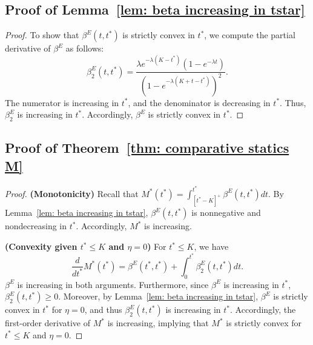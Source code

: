 \documentclass[12pt, letterpaper]{article}
\begin{document}
\subsection{Proof of Lemma~\ref{lem: beta increasing in tstar}}\label{subsec: beta increasing in tstar}

\begin{proof}%

To show that $\beta^E(t, t^*)$ is strictly convex in $t^*$, we compute the partial derivative of $\beta^E$ as follows:
\begin{equation}
    \beta^E_2(t, t^*) = \frac{\lambda e^{-\lambda (K - t^*)}(1 - e^{-\lambda t})}{(1 - e^{- \lambda (K + t - t^*)})^2}.
\end{equation}
The numerator is increasing in $t^*$, and the denominator is decreasing in $t^*$. Thus, $\beta_2^E$ is increasing in $t^*$. Accordingly, $\beta^E$ is strictly convex in $t^*$.
\end{proof}%

\subsection{Proof of Theorem~\ref{thm: comparative statics M}} \label{subsec: comparative statics M}

\begin{proof} %
    \textbf{(Monotonicity)}
    Recall that $M^*(t^*) = \int_{[t^* - K]^+}^{t^*} \beta^E(t, t^*) dt$.
    By Lemma~\ref{lem: beta increasing in tstar}, $\beta^E(t, t^*)$ is nonnegative and nondecreasing in $t^*$. Accordingly, $M^*$ is increasing.

    \noindent
    \textbf{(Convexity given $t^* \le K$ and $\eta = 0$)}
    For $t^* \le K$, we have
    \begin{equation}
        \frac{d}{dt^*}M^*(t^*) = \beta^E(t^*, t^*)  + \int_{0}^{t^*}\beta_2^E(t, t^*)dt.
    \end{equation}
    $\beta^E$ is increasing in both arguments. Furthermore, since $\beta^E$ is increasing in $t^*$, $\beta_2^E(t, t^*) \ge 0$. Moreover, by Lemma~\ref{lem: beta increasing in tstar}, $\beta^E$ is strictly convex in $t^*$ for $\eta = 0$, and thus $\beta_2^E(t, t^*)$ is increasing in $t^*$. Accordingly, the first-order derivative of $M^*$ is increasing, implying that $M^*$ is strictly convex for $t^* \le K$ and $\eta = 0$.
\end{proof} %
\end{document}
